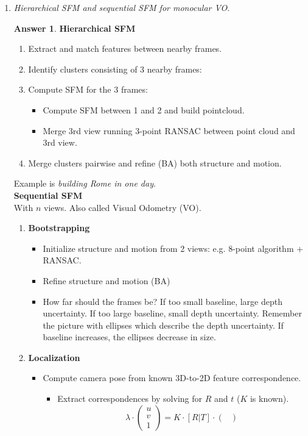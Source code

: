 \documentclass[a4paper,12 pt]{article}
\theoremstyle{definition}
\theoremstyle{remark}
\theoremstyle{definition}
\theoremstyle{definition}
\theoremstyle{definition}
\theoremstyle{definition}
\theoremstyle{remark}
\theoremstyle{remark}
\theoremstyle{definition}
\theoremstyle{definition}
\newtheorem*{answer}{Answer}
\begin{document}
\begin{enumerate}
\item \textit{Hierarchical SFM and sequential SFM for monocular VO. }
\begin{answer}
\textbf{Hierarchical SFM}
\begin{enumerate}
\item Extract and match features between nearby frames.
\item Identify clusters consisting of 3 nearby frames:
\item Compute SFM for the 3 frames:
\begin{itemize}
\item Compute SFM between 1 and 2 and build pointcloud.
\item Merge 3rd view running 3-point RANSAC between point cloud and 3rd view.
\end{itemize}
\item Merge clusters pairwise and refine (BA) both structure and motion. 
\end{enumerate}
Example is \textit{building Rome in one day}.\\
\textbf{Sequential SFM}\\
With $n$ views. Also called Visual Odometry (VO). 
\begin{enumerate}
\item \textbf{Bootstrapping}
\begin{itemize}
\item Initialize structure and motion from 2 views: e.g. 8-point algorithm + RANSAC.
\item Refine structure and motion (BA)
\item How far should the frames be? If too small baseline, large depth uncertainty. If too large baseline, small depth uncertainty.
Remember the picture with ellipses which describe the depth uncertainty. If baseline increases, the ellipses decrease in size.
\end{itemize}
\item \textbf{Localization}
\begin{itemize}
\item Compute camera pose from known 3D-to-2D feature correspondence. 
\begin{itemize}
\item Extract correspondences by solving for $R$ and $t$ ($K$ is known).
\begin{equation}
 \lambda \cdot \begin{pmatrix}
 u\\
 v\\
 1
 \end{pmatrix}=K\cdot [R|T]\cdot \begin{pmatrix}

\end{pmatrix}
\end{equation}
\end{itemize}
\end{itemize}
\end{enumerate}
\end{answer}
\end{enumerate}
\end{document}
